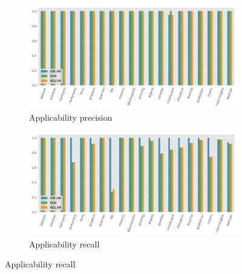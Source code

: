 \begin{figure}[ht]
  \begin{subfigure}[b]{0.45\textwidth}
    \includegraphics[width=\textwidth]{figures/10_traces/app_precision.png}
    \caption{Applicability precision}
  \end{subfigure}
  \hfill
  \begin{subfigure}[b]{0.45\textwidth}
    \includegraphics[width=\textwidth]{figures/10_traces/app_recall.png}
    \caption{Applicability recall}
  \end{subfigure}

  \vspace{1em}


\end{figure}
